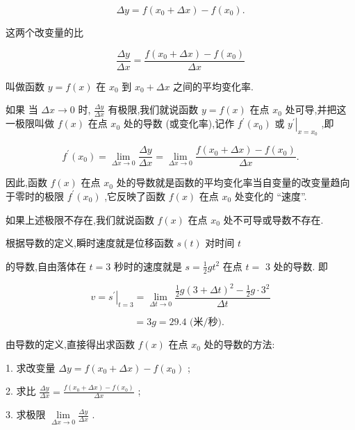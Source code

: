 \documentclass[10pt]{article}
\begin{document}
\[
{\Delta y} = f\left( {{x}_{0} + {\Delta x}}\right) - f\left( {x}_{0}\right) .
\]

这两个改变量的比

\[
\frac{\Delta y}{\Delta x} = \frac{f\left( {{x}_{0} + {\Delta x}}\right) - f\left( {x}_{0}\right) }{\Delta x}
\]

叫做函数 \(y = f\left( x\right)\) 在 \({x}_{0}\) 到 \({x}_{0} + {\Delta x}\) 之间的平均变化率.

如果 当 \({\Delta x} \rightarrow 0\) 时, \(\frac{\Delta y}{\Delta x}\) 有极限,我们就说函数 \(y = f\left( x\right)\) 在点 \({x}_{0}\) 处可导,并把这一极限叫做 \(f\left( x\right)\) 在点 \({x}_{0}\) 处的导数 (或变化率),记作 \({f}^{\prime }\left( {x}_{0}\right)\) 或 \({\left. {y}^{\prime }\right| }_{x = {x}_{0}}\) ,即

\[
{f}^{\prime }\left( {x}_{0}\right) = \mathop{\lim }\limits_{{{\Delta x} \rightarrow 0}}\frac{\Delta y}{\Delta x} = \mathop{\lim }\limits_{{{\Delta x} \rightarrow 0}}\frac{f\left( {{x}_{0} + {\Delta x}}\right) - f\left( {x}_{0}\right) }{\Delta x}. \tag{1}
\]

因此,函数 \(f\left( x\right)\) 在点 \({x}_{0}\) 处的导数就是函数的平均变化率当自变量的改变量趋向于零时的极限 \({f}^{\prime }\left( {x}_{0}\right)\) ,它反映了函数 \(f\left( x\right)\) 在点 \({x}_{0}\) 处变化的 “速度”.

如果上述极限不存在,我们就说函数 \(f\left( x\right)\) 在点 \({x}_{0}\) 处不可导或导数不存在.

根据导数的定义,瞬时速度就是位移函数 \(s\left( t\right)\) 对时间 \(t\)

的导数,自由落体在 \(t = 3\) 秒时的速度就是 \(s = \frac{1}{2}g{t}^{2}\) 在点 \(t =\) 3 处的导数. 即

\[
v = {\left. {s}^{\prime }\right| }_{t = 3} = \mathop{\lim }\limits_{{{\Delta t} \rightarrow 0}}\frac{\frac{1}{2}g{\left( 3 + \Delta t\right) }^{2} - \frac{1}{2}g \cdot {3}^{2}}{\Delta t}
\]

\[
= {3g} = {29.4}\text{ (米/秒). }
\]

由导数的定义,直接得出求函数 \(f\left( x\right)\) 在点 \({x}_{0}\) 处的导数的方法:

1. 求改变量 \({\Delta y} = f\left( {{x}_{0} + {\Delta x}}\right) - f\left( {x}_{0}\right)\) ;

2. 求比 \(\frac{\Delta y}{\Delta x} = \frac{f\left( {{x}_{0} + {\Delta x}}\right) - f\left( {x}_{0}\right) }{\Delta x}\) ;

3. 求极限 \(\mathop{\lim }\limits_{{{\Delta x} \rightarrow 0}}\frac{\Delta y}{\Delta x}\) .
\end{document}
